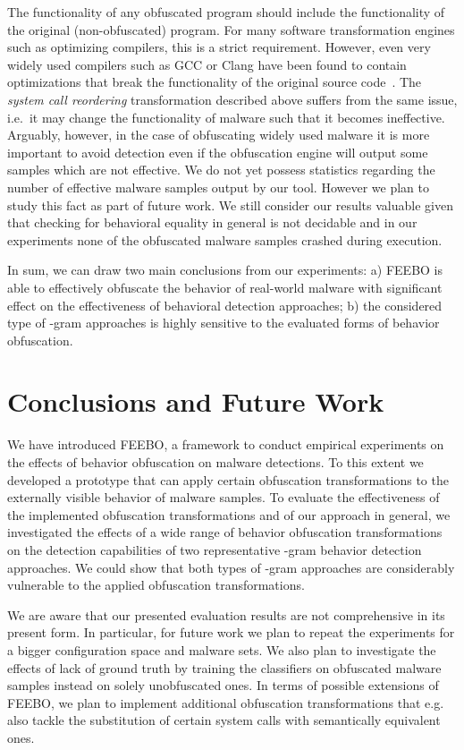 \documentclass{llncs}
\begin{document}
The functionality of any obfuscated program should include the functionality of the original (non-obfuscated) program. For many software transformation engines such as optimizing compilers, this is a strict requirement. However, even very widely used compilers such as GCC or Clang have been found to contain optimizations that break the functionality of the original source code~\cite{Yang2011}. The \emph{system call reordering} transformation described above suffers from the same issue, i.e.~it may change the functionality of malware such that it becomes ineffective. 
Arguably, however, in the case of obfuscating widely used malware it is more important to avoid detection even if the obfuscation engine will output some samples which are not effective. We do not yet possess statistics regarding the number of effective malware samples output by our tool. However we plan to study this fact as part of future work. We still consider our results valuable given that checking for behavioral equality in general is not decidable and in our experiments none of the obfuscated malware samples crashed during execution.

In sum, we can draw two main conclusions from our experiments: a) FEEBO is able to effectively obfuscate the behavior of real-world malware with significant effect on the effectiveness of behavioral detection approaches; b) the considered type of -gram approaches is highly sensitive to the evaluated forms of behavior obfuscation.
 
\section{Conclusions and Future Work}
\label{sec:conclusion}

We have introduced FEEBO, a framework to conduct empirical experiments on the effects of behavior obfuscation on malware detections. To this extent we developed a prototype that can apply certain obfuscation transformations to the externally visible behavior of malware samples. 
To evaluate the effectiveness of the implemented obfuscation transformations and of our approach in general, we investigated the effects of a wide range of behavior obfuscation transformations on the detection capabilities of two representative -gram behavior detection approaches. 
We could show that both types of -gram approaches are considerably vulnerable to the applied obfuscation transformations. 

We are aware that our presented evaluation results are not comprehensive 
in its present form. In particular, for future work we plan to repeat the experiments for a bigger configuration space and malware sets. We also plan to investigate the effects of lack of ground truth by training the classifiers on obfuscated malware samples instead on solely unobfuscated ones. 
In terms of possible extensions of FEEBO, we plan to implement additional obfuscation transformations that e.g. also tackle the substitution of certain system calls with semantically equivalent ones. 
\end{document}
